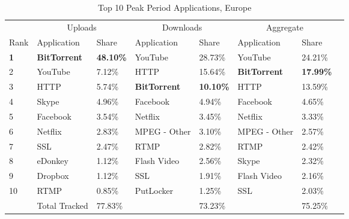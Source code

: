 \begin{table}[h]
\centering
\begin{tabular}{llllllll}
           & \multicolumn{2}{c}{Uploads}                          & \multicolumn{2}{c}{Downloads}         & \multicolumn{2}{c}{Aggregate}                 &        \\
Rank       & Application                       & Share            & Application         & Share            & Application         & Share            &        \\
\hline
\textbf{1} & \textbf{BitTorrent}               & \textbf{48.10\%} & YouTube             & 28.73\%          & YouTube             & 24.21\%          &        \\
2          & YouTube                           & 7.12\%           & HTTP                & 15.64\%          & \textbf{BitTorrent} & \textbf{17.99\%} &        \\
3          & HTTP                              & 5.74\%           & \textbf{BitTorrent} & \textbf{10.10\%} & HTTP                & 13.59\%          &        \\
4          & Skype                             & 4.96\%           & Facebook            & 4.94\%           & Facebook            & 4.65\%           &        \\
5          & Facebook                          & 3.54\%           & Netflix             & 3.45\%           & Netflix             & 3.33\%           &        \\
6          & Netflix                           & 2.83\%           & MPEG - Other        & 3.10\%           & MPEG - Other        & 2.57\%           &        \\
7          & SSL                               & 2.47\%           & RTMP                & 2.82\%           & RTMP                & 2.42\%           &        \\
8        & eDonkey                  & 1.12\%  & Flash Video         & 2.56\%           & Skype               & 2.32\%           &        \\
9          & Dropbox                           & 1.12\%           & SSL                 & 1.91\%           & Flash Video            & 2.16\% \\
10         & RTMP                              & 0.85\%           & PutLocker           & 1.25\%           & SSL                 & 2.03\%           &        \\
           & \multicolumn{1}{r}{Total Tracked} & 77.83\%          &                     & 73.23\%          &                     & 75.25\%          &       
\end{tabular}
\caption{Top 10 Peak Period Applications, Europe \citep{sandvinereport}}
\label{table:sandvinereport}
\end{table}